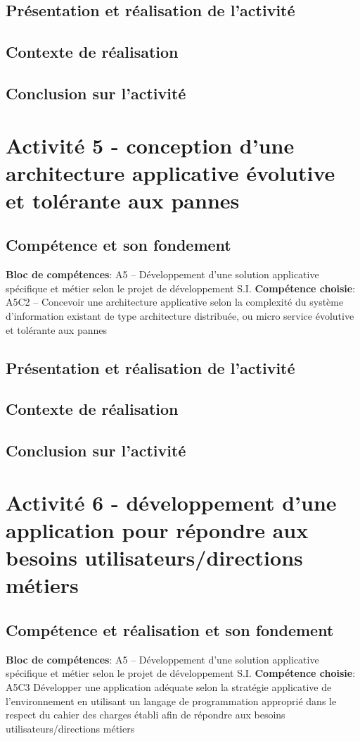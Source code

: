 \documentclass[a4paper, 11pt]{report}
\begin{document}
\subsection{Présentation et réalisation de l'activité}
\subsection{Contexte de réalisation}
\subsection{Conclusion sur l'activité}

\section{Activité 5 - conception d'une architecture applicative évolutive et tolérante aux pannes}
\subsection{Compétence et son fondement}
\textbf{Bloc de compétences}: A5 – Développement d’une solution applicative spécifique et métier selon le projet de développement S.I.
\newline
\textbf{Compétence choisie}: A5C2 – Concevoir une architecture applicative selon la complexité du système d’information existant de type architecture distribuée, ou micro service évolutive et tolérante aux pannes
\subsection{Présentation et réalisation de l'activité}
\subsection{Contexte de réalisation}
\subsection{Conclusion sur l'activité}

\section{Activité 6 - développement d'une application pour répondre aux besoins utilisateurs/directions métiers}
\subsection{Compétence et réalisation et son fondement}
\textbf{Bloc de compétences}: A5 – Développement d’une solution applicative spécifique et métier selon le projet de développement S.I.
\newline
\textbf{Compétence choisie}: A5C3 Développer une application adéquate selon la stratégie applicative de l’environnement en utilisant un langage de programmation approprié dans le respect du cahier des charges établi afin de répondre aux besoins utilisateurs/directions métiers
\end{document}
